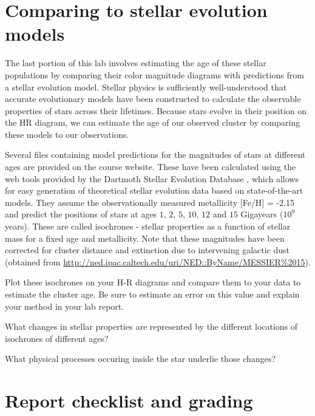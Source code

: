 \section{Comparing to stellar evolution models}

The last portion of this lab involves estimating the age of these stellar populations by comparing their color magnitude diagrams with predictions from a stellar evolution model. Stellar physics is sufficiently well-understood that accurate evolutionary models have been constructed to calculate the observable properties of stars across their lifetimes. Because stars evolve in their position on the HR diagram, we can estimate the age of our observed cluster by comparing these models to our observations.

Several files containing model predictions for the magnitudes of stars at different ages are provided on the course website. These have been calculated using the web tools provided by the Dartmoth Stellar Evolution Database \cite{Dotter2008}, which allows for easy generation of theoretical stellar evolution data based on state-of-the-art models. They assume the observationally measured metallicity [Fe/H] = -2.15 \cite{DurrellHarris1993} and predict the positions of stars at ages $1$, $2$, $5$, $10$, $12$ and $15$ Gigayears ($10^9$ years). These are called isochrones - stellar properties as a function of stellar mass for a fixed age and metallicity. Note that these magnitudes have been corrected for cluster distance \cite{DurrellHarris1993} and extinction due to intervening galactic dust \cite{Schlafly2011} (obtained from \url{http://ned.ipac.caltech.edu/uri/NED::ByName/MESSIER%2015}).

\begin{steps}
	\item Plot these isochrones on your H-R diagrams and compare them to your data to estimate the cluster age. Be sure to estimate an error on this value and explain your method in your lab report.
	
	\item What changes in stellar properties are represented by the different locations of isochrones of different ages?
	
	\item What physical processes occuring inside the star underlie those changes?
\end{steps}

\section{Report checklist and grading}


